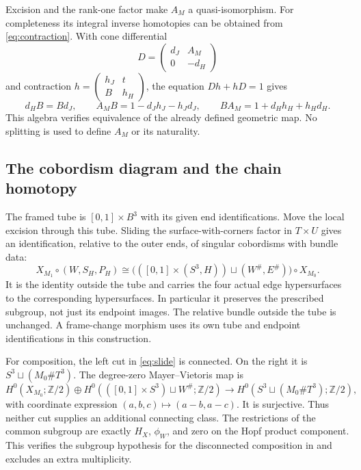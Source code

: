 \documentclass[11pt]{amsart}
\theoremstyle{definition}
\theoremstyle{remark}
\theoremstyle{plain}
\newcommand{\ZZ}{\mathbb Z}
\begin{document}
Excision and the rank-one factor make $A_M$ a quasi-isomorphism.
For completeness its integral inverse homotopies can be obtained
from \eqref{eq:contraction}. With cone differential
\[
 D=\begin{pmatrix}d_J&A_M\\0&-d_H\end{pmatrix}
\]
and contraction $h=\left(\begin{smallmatrix}h_J&t\\B&h_H\end{smallmatrix}\right)$,
the equation $Dh+hD=1$ gives
\[
 d_HB=Bd_J,\qquad
 A_MB=1-d_Jh_J-h_Jd_J,\qquad
 BA_M=1+d_Hh_H+h_Hd_H.
\]
This algebra verifies equivalence of the already defined geometric
map. No splitting is used to define $A_M$ or its naturality.

\subsection{The cobordism diagram and the chain homotopy}
The framed tube is $[0,1]\times B^3$ with its given end
identifications. Move the local excision through this tube. Sliding
the surface-with-corners factor in $T\times U$ gives an
identification, relative to the outer ends, of singular cobordisms
with bundle data:
\begin{equation}\label{eq:slide}
 X_{M_1}\circ(W,S_H,P_H)
 \cong\bigl(([0,1]\times(S^3,H))\sqcup(W^\#,E^\#)\bigr)\circ X_{M_0}.
\end{equation}
It is the identity outside the tube and carries the four actual
edge hypersurfaces to the corresponding hypersurfaces. In
particular it preserves the prescribed subgroup, not just its
endpoint images. The relative bundle outside the tube is unchanged.
A frame-change morphism uses its own tube and endpoint
identifications in this construction.

For composition, the left cut in \eqref{eq:slide} is connected.
On the right it is $S^3\sqcup(M_0\#T^3)$. The degree-zero
Mayer--Vietoris map is
\[
 H^0(X_{M_0};\ZZ/2)\oplus
 H^0(([0,1]\times S^3)\sqcup W^\#;\ZZ/2)
 \longrightarrow H^0(S^3\sqcup(M_0\#T^3);\ZZ/2),
\]
with coordinate expression $(a,b,c)\mapsto(a-b,a-c)$. It is
surjective. Thus neither cut supplies an additional connecting
class. The restrictions of the common subgroup are exactly $H_X$,
$\phi_W$, and zero on the Hopf product component. This verifies
the subgroup hypothesis for the disconnected composition in
\cite[Proposition~5.4]{KM} and excludes an extra multiplicity.
\end{document}
